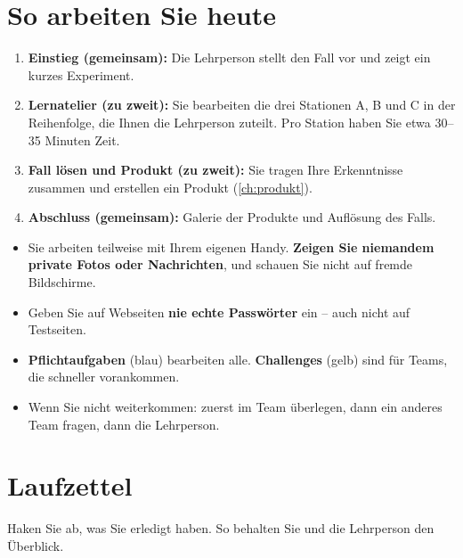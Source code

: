 \section{So arbeiten Sie heute}

\begin{myprocedure}
	\begin{enumerate}
		\item \textbf{Einstieg (gemeinsam):} Die Lehrperson stellt den Fall vor und zeigt ein kurzes Experiment.
		\item \textbf{Lernatelier (zu zweit):} Sie bearbeiten die drei Stationen A, B und C in der Reihenfolge, die Ihnen die Lehrperson zuteilt. Pro Station haben Sie etwa 30--35 Minuten Zeit.
		\item \textbf{Fall lösen und Produkt (zu zweit):} Sie tragen Ihre Erkenntnisse zusammen und erstellen ein Produkt (\cref{ch:produkt}).
		\item \textbf{Abschluss (gemeinsam):} Galerie der Produkte und Auflösung des Falls.
	\end{enumerate}
\end{myprocedure}

\begin{myattention}
	\begin{itemize}
		\item Sie arbeiten teilweise mit Ihrem eigenen Handy. \textbf{Zeigen Sie niemandem private Fotos oder Nachrichten}, und schauen Sie nicht auf fremde Bildschirme.
		\item Geben Sie auf Webseiten \textbf{nie echte Passwörter} ein -- auch nicht auf Testseiten.
		\item \textbf{Pflichtaufgaben} (blau) bearbeiten alle. \textbf{Challenges} (gelb) sind für Teams, die schneller vorankommen.
		\item Wenn Sie nicht weiterkommen: zuerst im Team überlegen, dann ein anderes Team fragen, dann die Lehrperson.
	\end{itemize}
\end{myattention}

\section{Laufzettel}

Haken Sie ab, was Sie erledigt haben. So behalten Sie und die Lehrperson den Überblick.

